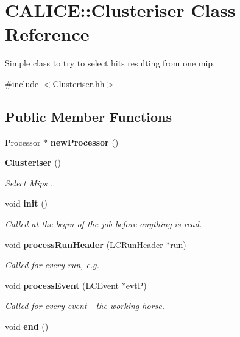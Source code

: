 \section{CALICE::Clusteriser Class Reference}
\label{classCALICE_1_1Clusteriser}


Simple class to try to select hits resulting from one mip.  


{\ttfamily \#include $<$Clusteriser.hh$>$}\subsection*{Public Member Functions}
\begin{DoxyCompactItemize}
\item 
Processor $\ast$ {\bfseries newProcessor} ()\label{classCALICE_1_1Clusteriser_afc7acd77a2c4c6108896d86185534533}

\item 
{\bf Clusteriser} ()
\begin{DoxyCompactList}\small\item\em Select Mips . \item\end{DoxyCompactList}\item 
void {\bf init} ()
\begin{DoxyCompactList}\small\item\em Called at the begin of the job before anything is read. \item\end{DoxyCompactList}\item 
void {\bf processRunHeader} (LCRunHeader $\ast$run)
\begin{DoxyCompactList}\small\item\em Called for every run, e.g. \item\end{DoxyCompactList}\item 
void {\bf processEvent} (LCEvent $\ast$evtP)\label{classCALICE_1_1Clusteriser_a1970423a42279c703863638f1b8cc298}

\begin{DoxyCompactList}\small\item\em Called for every event -\/ the working horse. \item\end{DoxyCompactList}\item 
void {\bfseries end} ()\label{classCALICE_1_1Clusteriser_a70d9b2bb4d1be51c3608c0e57b398926}

\end{DoxyCompactItemize}
